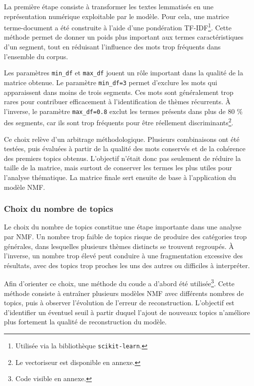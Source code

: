 La première étape consiste à transformer les textes lemmatisés en une représentation numérique exploitable par le modèle. Pour cela, une matrice terme-document a été construite à l'aide d'une pondération TF-IDF\footnote{Utilisée via la bibliothèque \texttt{scikit-learn}.}. Cette méthode permet de donner un poids plus important aux termes caractéristiques d'un segment, tout en réduisant l'influence des mots trop fréquents dans l'ensemble du corpus.

Les paramètres \texttt{min\_df} et \texttt{max\_df} jouent un rôle important dans la qualité de la matrice obtenue. Le paramètre \texttt{min\_df=3} permet d'exclure les mots qui apparaissent dans moins de trois segments. Ces mots sont généralement trop rares pour contribuer efficacement à l'identification de thèmes récurrents. À l'inverse, le paramètre \texttt{max\_df=0.8} exclut les termes présents dans plus de 80 \% des segments, car ils sont trop fréquents pour être réellement discriminants\footnote{Le vectoriseur est disponible en annexe.}.

Ce choix relève d'un arbitrage méthodologique. Plusieurs combinaisons ont été testées, puis évaluées à partir de la qualité des mots conservés et de la cohérence des premiers topics obtenus. L'objectif n'était donc pas seulement de réduire la taille de la matrice, mais surtout de conserver les termes les plus utiles pour l'analyse thématique. La matrice finale sert ensuite de base à l'application du modèle NMF.

\subsubsection{Choix du nombre de topics}

Le choix du nombre de topics constitue une étape importante dans une analyse par NMF. Un nombre trop faible de topics risque de produire des catégories trop générales, dans lesquelles plusieurs thèmes distincts se trouvent regroupés. À l'inverse, un nombre trop élevé peut conduire à une fragmentation excessive des résultats, avec des topics trop proches les uns des autres ou difficiles à interpréter.

Afin d'orienter ce choix, une méthode du coude a d'abord été utilisée\footnote{Code visible en annexe.}. Cette méthode consiste à entraîner plusieurs modèles NMF avec différents nombres de topics, puis à observer l'évolution de l'erreur de reconstruction. L'objectif est d'identifier un éventuel seuil à partir duquel l'ajout de nouveaux topics n'améliore plus fortement la qualité de reconstruction du modèle.

